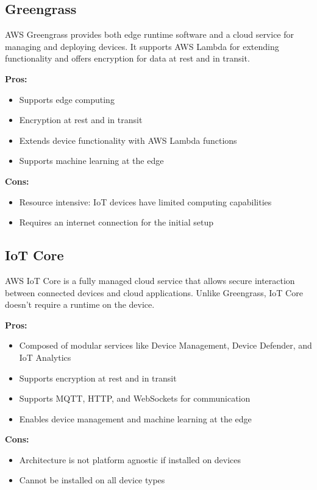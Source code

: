 \subsection*{Greengrass}
\label{aws:greengrass}
AWS Greengrass provides both edge runtime software and a cloud service for managing and deploying devices. It supports AWS Lambda for extending functionality and offers encryption for data at rest and in transit.

\textbf{Pros:}
\begin{itemize}
    \item Supports edge computing
    \item Encryption at rest and in transit
    \item Extends device functionality with AWS Lambda functions
    \item Supports machine learning at the edge
    \end{itemize}
\textbf{Cons:}
\begin{itemize}
    \item Resource intensive: IoT devices have limited computing capabilities
    \item Requires an internet connection for the initial setup

\end{itemize}

\subsection*{IoT Core}
\label{aws:iot-core}
AWS IoT Core is a fully managed cloud service that allows secure interaction between connected devices and cloud applications. Unlike Greengrass, IoT Core doesn’t require a runtime on the device.

\textbf{Pros:}
\begin{itemize}
    \item Composed of modular services like Device Management, Device Defender, and IoT Analytics
    \item Supports encryption at rest and in transit
    \item Supports MQTT, HTTP, and WebSockets for communication
    \item Enables device management and machine learning at the edge
\end{itemize}

\textbf{Cons:}
\begin{itemize}
    \item Architecture is not platform agnostic if installed on devices
    \item Cannot be installed on all device types
\end{itemize}

